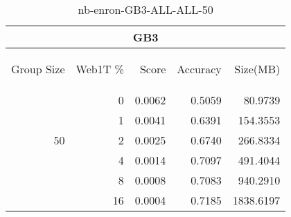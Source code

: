 \begin{center}
\begin{table}[htbp]
\begin{tabular}{ | r | r | r | r | r |}
\hline
\multicolumn{5}{|c|}{GB3}\\
\hline
\begin{sideways}Group Size\end{sideways} & \begin{sideways}Web1T \%\end{sideways} & \begin{sideways}Score\end{sideways} & \begin{sideways}Accuracy\end{sideways} & \begin{sideways}Size(MB)\end{sideways}\\
\hline
\multirow{5}{*}{50}
 & 0 & 0.0062 & 0.5059 & 80.9739\\ \cline{2-5}
 & 1 & 0.0041 & 0.6391 & 154.3553\\ \cline{2-5}
 & 2 & 0.0025 & 0.6740 & 266.8334\\ \cline{2-5}
 & 4 & 0.0014 & 0.7097 & 491.4044\\ \cline{2-5}
 & 8 & 0.0008 & 0.7083 & 940.2910\\ \cline{2-5}
 & 16 & 0.0004 & 0.7185 & 1838.6197\\ \cline{2-5}
\hline
\end{tabular}
\caption{nb-enron-GB3-ALL-ALL-50}
\label{table:nb-enron-GB3-ALL-ALL-50}
\end{table}
\end{center}

